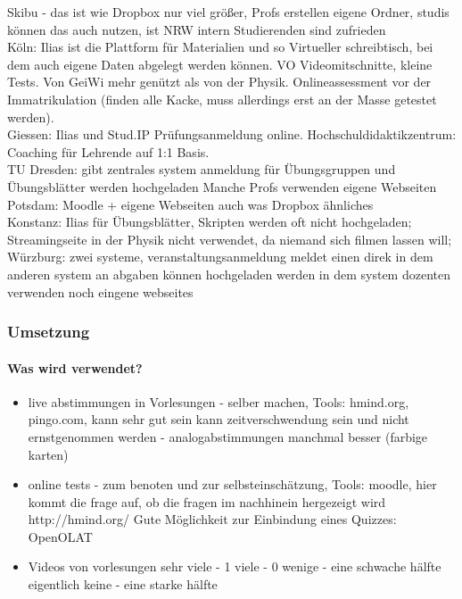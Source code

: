 \begin{itemize}
{\begin{itemize}
Skibu - das ist wie Dropbox nur viel größer, Profs erstellen eigene Ordner, studis können das auch nutzen, ist NRW intern
Studierenden sind zufrieden \\
Köln: Ilias ist die Plattform für Materialien und so
Virtueller schreibtisch, bei dem auch eigene Daten abgelegt werden können. VO Videomitschnitte, kleine Tests. Von GeiWi mehr genützt als von der Physik.
Onlineassessment vor der Immatrikulation (finden alle Kacke, muss allerdings erst an der Masse getestet werden). \\
Giessen: Ilias und Stud.IP
Prüfungsanmeldung online. Hochschuldidaktikzentrum: Coaching für Lehrende auf 1:1 Basis. \\
TU Dresden: gibt zentrales system
anmeldung für Übungsgruppen und Übungsblätter werden hochgeladen
Manche Profs verwenden eigene Webseiten \\
Potsdam: Moodle + eigene Webseiten
auch was Dropbox ähnliches \\
Konstanz: Ilias für Übungsblätter, Skripten werden oft nicht hochgeladen; Streamingseite in der Physik nicht verwendet, da niemand sich filmen lassen will; \\
Würzburg: zwei systeme, veranstaltungsanmeldung meldet einen direk in dem anderen system an
abgaben können hochgeladen werden in dem system
dozenten verwenden noch eingene webseites
\subsubsection*{Umsetzung}
	\paragraph{Was wird verwendet?}
		\begin{itemize}
			\item live abstimmungen in Vorlesungen - selber machen, Tools: hmind.org, pingo.com,
			kann sehr gut sein
			kann zeitverschwendung sein und nicht ernstgenommen werden - analogabstimmungen manchmal besser (farbige karten)

			\item online tests - zum benoten und zur selbsteinschätzung, Tools: moodle,
			hier kommt die frage auf, ob die fragen im nachhinein hergezeigt wird
			http://hmind.org/
			Gute Möglichkeit zur Einbindung eines Quizzes: OpenOLAT

			\item Videos von vorlesungen
			sehr viele - 1
			viele - 0
			wenige - eine schwache hälfte
			eigentlich keine - eine starke hälfte


\end{itemize}
\end{itemize}}
\end{itemize}
